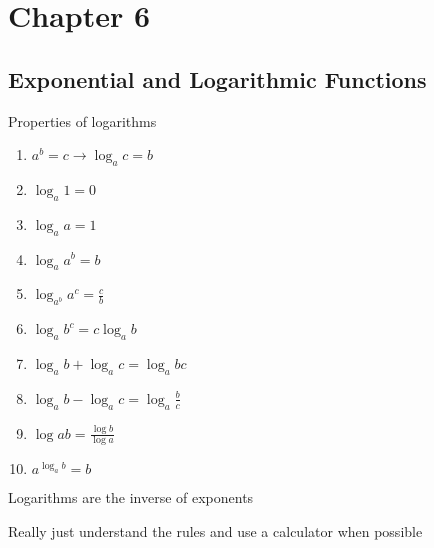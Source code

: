 \documentclass[../main.tex]{subfiles}
\begin{document}
\section{Chapter 6}
\subsection{Exponential and Logarithmic Functions}
Properties of logarithms

\begin{enumerate}
    \item $a^b=c\rightarrow \log_{a}c=b$
    \item $\log_{a}1=0$
    \item $\log_{a}a=1$
    \item $\log_{a}a^b=b$
    \item $\log_{a^b}a^c=\frac{c}{b}$
    \item $\log_{a}b^c=c\log_{a}b$
    \item $\log_{a}b+\log_{a}c=\log_{a}bc$
    \item $\log_{a}b-\log_{a}c=\log_{a}\frac{b}{c}$
    \item $\log{a}b=\frac{\log b}{\log a}$
    \item $a^{\log_{a} b}=b$
\end{enumerate}

Logarithms are the inverse of exponents

Really just understand the rules and use a calculator when possible
\end{document}

